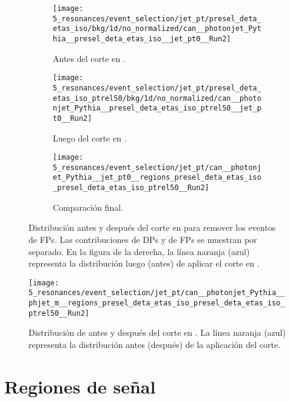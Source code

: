\begin{figure}[ht!]
    \centering
    \begin{subfigure}[h]{0.32\linewidth}
        \centering
        \texttt{[image: 5\_resonances/event\_selection/jet\_pt/presel\_deta\_etas\_iso/bkg/1d/no\_normalized/can\_\_photonjet\_Pythia\_\_presel\_deta\_etas\_iso\_\_jet\_pt0\_\_Run2]}
        \caption{Antes del corte en \ptjet.}
    \end{subfigure}
    \hfill
    \begin{subfigure}[h]{0.32\linewidth}
        \centering
        \texttt{[image: 5\_resonances/event\_selection/jet\_pt/presel\_deta\_etas\_iso\_ptrel50/bkg/1d/no\_normalized/can\_\_photonjet\_Pythia\_\_presel\_deta\_etas\_iso\_ptrel50\_\_jet\_pt0\_\_Run2]}
        \caption{Luego del corte en \ptjet.}
    \end{subfigure}
    \hfill
    \begin{subfigure}[h]{0.32\linewidth}
        \centering
        \texttt{[image: 5\_resonances/event\_selection/jet\_pt/can\_\_photonjet\_Pythia\_\_jet\_pt0\_\_regions\_presel\_deta\_etas\_iso\_presel\_deta\_etas\_iso\_ptrel50\_\_Run2]}
        \caption{Comparación final.}
    \end{subfigure}
    \caption{Distribución antes y después del corte en \ptjet para remover los eventos de \acp{FP}. Las contribuciones de \acp{DP} y de \acp{FP} se muestran por separado. En la figura de la derecha, la línea naranja (azul) representa la distribución luego (antes) de aplicar el corte en \ptjet.}
    \label{fig:evt_selection:sr_opt:jet_pt:jet_pt}
\end{figure}



\begin{figure}[ht!]
    \centering
    \texttt{[image: 5\_resonances/event\_selection/jet\_pt/can\_\_photonjet\_Pythia\_\_phjet\_m\_\_regions\_presel\_deta\_etas\_iso\_presel\_deta\_etas\_iso\_ptrel50\_\_Run2]}
    \caption{Distribución de \myj antes y después del corte en \ptjet. La línea naranja (azul) representa la distribución antes (después) de la aplicación del corte.}
    \label{fig:evt_selection:sr_opt:jet_pt:phjet_m}
\end{figure}















\section{Regiones de señal}
\label{sec:evt_selection:sr}


